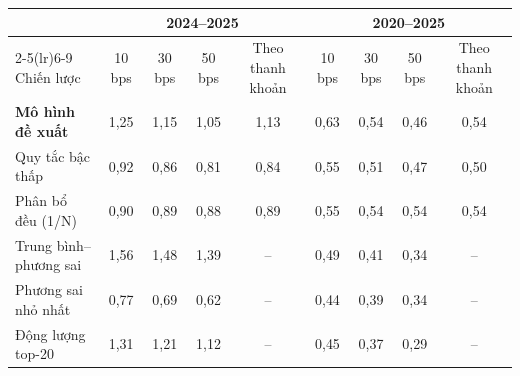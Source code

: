 \begin{tabular}{@{}lcccccccc@{}}
\toprule
 & \multicolumn{4}{c}{2024--2025} & \multicolumn{4}{c}{2020--2025} \\
\cmidrule(lr){2-5}\cmidrule(lr){6-9}
Chiến lược & 10 bps & 30 bps & 50 bps & Theo thanh khoản & 10 bps & 30 bps & 50 bps & Theo thanh khoản \\
\midrule
\textbf{Mô hình đề xuất} & 1{,}25 & 1{,}15 & 1{,}05 & 1{,}13 & 0{,}63 & 0{,}54 & 0{,}46 & 0{,}54 \\
Quy tắc bậc thấp & 0{,}92 & 0{,}86 & 0{,}81 & 0{,}84 & 0{,}55 & 0{,}51 & 0{,}47 & 0{,}50 \\
Phân bổ đều (1/N) & 0{,}90 & 0{,}89 & 0{,}88 & 0{,}89 & 0{,}55 & 0{,}54 & 0{,}54 & 0{,}54 \\
Trung bình--phương sai & 1{,}56 & 1{,}48 & 1{,}39 & -- & 0{,}49 & 0{,}41 & 0{,}34 & -- \\
Phương sai nhỏ nhất & 0{,}77 & 0{,}69 & 0{,}62 & -- & 0{,}44 & 0{,}39 & 0{,}34 & -- \\
Động lượng top-20 & 1{,}31 & 1{,}21 & 1{,}12 & -- & 0{,}45 & 0{,}37 & 0{,}29 & -- \\
\bottomrule
\end{tabular}
